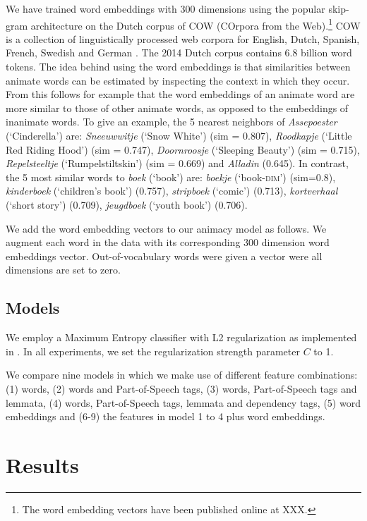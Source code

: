 \documentclass[a4paper,UKenglish]{oasics}
\begin{document}
We have trained word embeddings with 300 dimensions using the popular
skip-gram architecture \cite{mikolov:13} on the Dutch corpus of COW
(COrpora from the Web).\footnote{The word embedding vectors have been
  published online at XXX.} COW is a collection of linguistically
processed web corpora for English, Dutch, Spanish, French, Swedish and
German \cite{schaefer:12}. The 2014 Dutch corpus contains 6.8 billion
word tokens. The idea behind using the word embeddings is that
similarities between animate words can be estimated by inspecting the
context in which they occur. From this follows for example that the word
embeddings of an animate word are more similar to those of other
animate words, as opposed to the embeddings of inanimate words. To give an
example, the 5 nearest neighbors of \textit{Assepoester}
(`Cinderella') are: \textit{Sneeuwwitje} (`Snow White') (sim = 0.807),
\textit{Roodkapje} (`Little Red Riding Hood') (sim = 0.747),
\textit{Doornroosje} (`Sleeping Beauty') (sim = 0.715),
\textit{Repelsteeltje} (`Rumpelstiltskin') (sim = 0.669) and
\textit{Alladin} (0.645). In contrast, the 5 most similar words to
\textit{boek} (`book') are: \textit{boekje} (`book-\textsc{dim}')
(sim=0.8), \textit{kinderboek} (`children's book') (0.757),
\textit{stripboek} (`comic') (0.713), \textit{kortverhaal} (`short
story') (0.709), \textit{jeugdboek} (`youth book') (0.706).

We add the word embedding vectors to our animacy model as follows. We
augment each word in the data with its corresponding 300 dimension
word embeddings vector. Out-of-vocabulary words were given a vector were all dimensions are set to zero.


\subsection{Models}
We employ a Maximum Entropy classifier with L2 regularization as
implemented in \cite{sklearn}. In all experiments, we set the
regularization strength parameter $C$ to 1.

We compare nine models in which we make use of different feature
combinations: (1) words, (2) words and Part-of-Speech tags, (3)
words, Part-of-Speech tags and lemmata, (4) words, Part-of-Speech
tags, lemmata and dependency tags, (5) word embeddings and (6-9) the
features in model 1 to 4 plus word embeddings. 


\section{Results}\label{sec:results}
\end{document}
